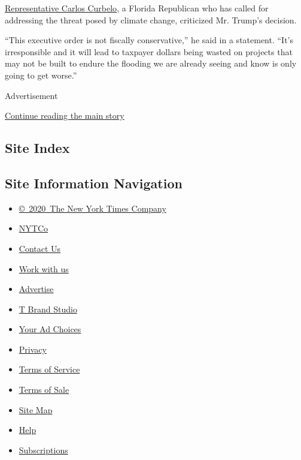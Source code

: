 \href{https://curbelo.house.gov/}{Representative Carlos Curbelo}, a
Florida Republican who has called for addressing the threat posed by
climate change, criticized Mr. Trump's decision.

``This executive order is not fiscally conservative,'' he said in a
statement. ``It's irresponsible and it will lead to taxpayer dollars
being wasted on projects that may not be built to endure the flooding we
are already seeing and know is only going to get worse.''

Advertisement

\protect\hyperlink{after-bottom}{Continue reading the main story}

\hypertarget{site-index}{%
\subsection{Site Index}\label{site-index}}

\hypertarget{site-information-navigation}{%
\subsection{Site Information
Navigation}\label{site-information-navigation}}

\begin{itemize}
\tightlist
\item
  \href{https://help.nytimes3xbfgragh.onion/hc/en-us/articles/115014792127-Copyright-notice}{©~2020~The
  New York Times Company}
\end{itemize}

\begin{itemize}
\tightlist
\item
  \href{https://www.nytco.com/}{NYTCo}
\item
  \href{https://help.nytimes3xbfgragh.onion/hc/en-us/articles/115015385887-Contact-Us}{Contact
  Us}
\item
  \href{https://www.nytco.com/careers/}{Work with us}
\item
  \href{https://nytmediakit.com/}{Advertise}
\item
  \href{http://www.tbrandstudio.com/}{T Brand Studio}
\item
  \href{https://www.nytimes3xbfgragh.onion/privacy/cookie-policy\#how-do-i-manage-trackers}{Your
  Ad Choices}
\item
  \href{https://www.nytimes3xbfgragh.onion/privacy}{Privacy}
\item
  \href{https://help.nytimes3xbfgragh.onion/hc/en-us/articles/115014893428-Terms-of-service}{Terms
  of Service}
\item
  \href{https://help.nytimes3xbfgragh.onion/hc/en-us/articles/115014893968-Terms-of-sale}{Terms
  of Sale}
\item
  \href{https://spiderbites.nytimes3xbfgragh.onion}{Site Map}
\item
  \href{https://help.nytimes3xbfgragh.onion/hc/en-us}{Help}
\item
  \href{https://www.nytimes3xbfgragh.onion/subscription?campaignId=37WXW}{Subscriptions}
\end{itemize}
